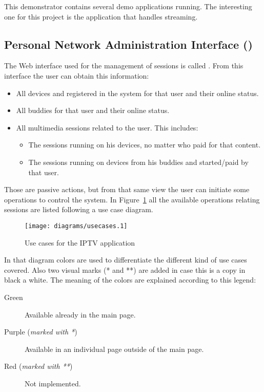 This demonstrator contains several demo applications running.
The interesting one for this project is the application that handles  streaming.


\subsection{Personal Network Administration Interface ()} %
\label{sub:pnai}

The Web interface used for the management of sessions is called . From this interface the user can obtain this information:

\begin{itemize}
  \item All devices and registered in the system for that user and their online status.
  \item All buddies for that user and their online status.
  \item All multimedia sessions related to the user. This includes:
  \begin{itemize}
    \item The sessions running on his devices, no matter who paid for that content.
    \item The sessions running on devices from his buddies and started/paid by that user.
  \end{itemize}
\end{itemize}

Those are passive actions, but from that same view the user can initiate some operations to control the system.
In Figure~\ref{fig:usecasesiptv} all the available operations relating sessions are listed following a use case diagram.

\begin{figure}[htbp]
  \centering
    \texttt{[image: diagrams/usecases.1]}
  \caption{Use cases for the IPTV application}
  \label{fig:usecasesiptv}
\end{figure}

In that diagram colors are used to differentiate the different kind of use cases covered. Also two visual marks (* and **) are added in case this is a copy in black a white. The meaning of the colors are explained according to this legend:

\begin{description}
  \item[Green] Available already in the main  page.
  \item[Purple (\emph{marked with *})] Available in an individual page outside of the main  page.
  \item[Red (\emph{marked with **})] Not implemented.
\end{description}


